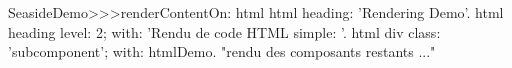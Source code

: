 \begin{method}[renderdemo]{}
SeasideDemo>>>renderContentOn: html
	html heading: 'Rendering Demo'.
	html heading
		level: 2;
		with: 'Rendu de code HTML simple: '.
	html div
		class: 'subcomponent';
		with: htmlDemo.
	"rendu des composants restants ..."
\end{method}
